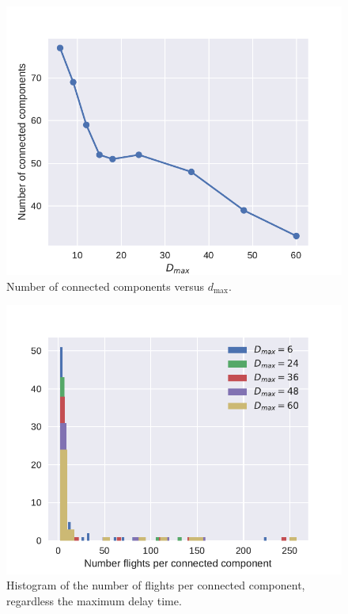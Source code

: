 \begin{figure}[h]
\includegraphics[width=\columnwidth]{pics/instances/num_cc.pdf}
\caption[Number of connected components vs. $d_{\max}$]{Number of connected components versus $d_{\max}$.}
\label{fig:num-CCs-vs-dmax}
\end{figure}

\begin{figure}[h]
\includegraphics[width=\columnwidth]{pics/instances/analysis_cc.pdf}
\caption[Histogram of connected component sizes]{Histogram of the number of flights per connected component, regardless the maximum delay time.}
\label{fig:hist-CC-sizes}
\end{figure}

